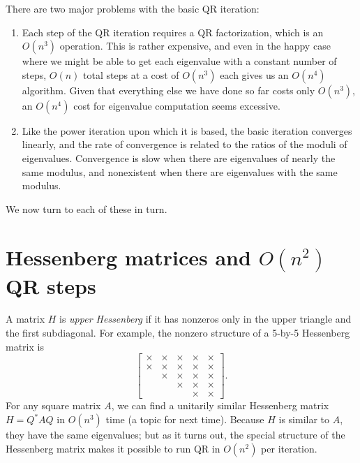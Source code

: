 \documentclass[12pt, leqno]{article} %
\begin{document}
There are two major problems with the basic QR iteration:
\begin{enumerate}
\item
  Each step of the QR iteration requires a QR factorization, which is
  an $O(n^3)$ operation.  This is rather expensive, and even in the happy
  case where we might be able to get each eigenvalue with a constant
  number of steps, $O(n)$ total steps at a cost of $O(n^3)$ each gives
  us an $O(n^4)$ algorithm.  Given that everything else we have done
  so far costs only $O(n^3)$, an $O(n^4)$ cost for eigenvalue computation
  seems excessive.
\item
  Like the power iteration upon which it is based, the basic iteration
  converges linearly, and the rate of convergence is related to the
  ratios of the moduli of eigenvalues.  Convergence is slow when there
  are eigenvalues of nearly the same modulus, and nonexistent when
  there are eigenvalues with the same modulus.
\end{enumerate}
We now turn to each of these in turn.

\section*{Hessenberg matrices and $O(n^2)$ QR steps}

A matrix $H$ is {\em upper Hessenberg} if it has nonzeros only in the
upper triangle and the first subdiagonal.  For example, the nonzero
structure of a 5-by-5 Hessenberg matrix is
\[
  \begin{bmatrix}
    \times & \times & \times & \times & \times \\
    \times & \times & \times & \times & \times \\
           & \times & \times & \times & \times \\
           &        & \times & \times & \times \\
           &        &        & \times & \times 
  \end{bmatrix}.
\]
For any square matrix $A$, we can find a unitarily similar Hessenberg
matrix $H = Q^* A Q$ in $O(n^3)$ time (a topic for next time).
Because $H$ is similar to $A$, they have the same eigenvalues; but
as it turns out, the special structure of the Hessenberg matrix
makes it possible to run QR in $O(n^2)$ per iteration.
\end{document}
